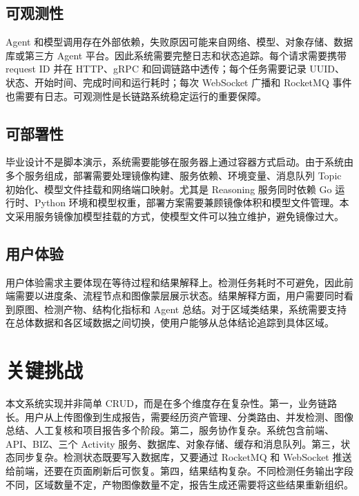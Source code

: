 \subsection{可观测性}
\label{subsec:observability-analysis}

Agent 和模型调用存在外部依赖，失败原因可能来自网络、模型、对象存储、数据库或第三方 Agent 平台。因此系统需要完整日志和状态追踪。每个请求需要携带 request ID 并在 HTTP、gRPC 和回调链路中透传；每个任务需要记录 UUID、状态、开始时间、完成时间和运行耗时；每次 WebSocket 广播和 RocketMQ 事件也需要有日志。可观测性是长链路系统稳定运行的重要保障。

\subsection{可部署性}
\label{subsec:deployability-analysis}

毕业设计不是脚本演示，系统需要能够在服务器上通过容器方式启动。由于系统由多个服务组成，部署需要处理镜像构建、服务依赖、环境变量、消息队列 Topic 初始化、模型文件挂载和网络端口映射。尤其是 Reasoning 服务同时依赖 Go 运行时、Python 环境和模型权重，部署方案需要兼顾镜像体积和模型文件管理。本文采用服务镜像加模型挂载的方式，使模型文件可以独立维护，避免镜像过大。

\subsection{用户体验}
\label{subsec:ux-analysis}

用户体验需求主要体现在等待过程和结果解释上。检测任务耗时不可避免，因此前端需要以进度条、流程节点和图像蒙层展示状态。结果解释方面，用户需要同时看到原图、检测产物、结构化指标和 Agent 总结。对于区域类结果，系统需要支持在总体数据和各区域数据之间切换，使用户能够从总体结论追踪到具体区域。

\section{关键挑战}
\label{sec:key-challenges}

本文系统实现并非简单 CRUD，而是在多个维度存在复杂性。第一，业务链路长。用户从上传图像到生成报告，需要经历资产管理、分类路由、并发检测、图像总结、人工复核和项目报告多个阶段。第二，服务协作复杂。系统包含前端、API、BIZ、三个 Activity 服务、数据库、对象存储、缓存和消息队列。第三，状态同步复杂。检测状态既要写入数据库，又要通过 RocketMQ 和 WebSocket 推送给前端，还要在页面刷新后可恢复。第四，结果结构复杂。不同检测任务输出字段不同，区域数量不定，产物图像数量不定，报告生成还需要将这些结果重新组织。

